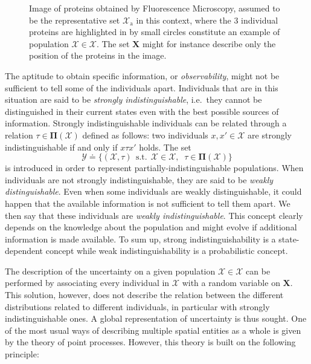 \documentclass{aptpub}
\numberwithin{equation}{section}
\begin{document}
\begin{figure}
\centering

\scriptsize

\caption{Image of proteins obtained by Fluorescence Microscopy, assumed to be the representative set ${\boldsymbol{\mathcal{X}}}_{\mathrm{a}}$ in this context, where the 3 individual proteins are highlighted in by small circles constitute an example of population ${\mathcal{X}} \in {\boldsymbol{\mathcal{X}}}$. The set ${\mathbf{X}}$ might for instance describe only the position of the proteins in the image.}
\label{fig:population}
\end{figure}

The aptitude to obtain specific information, or \emph{observability}, might not be sufficient to tell some of the individuals apart. Individuals that are in this situation are said to be \emph{strongly indistinguishable}, i.e.\ they cannot be distinguished in their current states even with the best possible sources of information. Strongly indistinguishable individuals can be related through a relation $\tau \in {\boldsymbol{\Pi}}({\mathcal{X}})$ defined as follows: two individuals $x,x' \in {\mathcal{X}}$ are strongly indistinguishable if and only if $x \tau x'$ holds. 
The set
{\begin{equation*}{
{\boldsymbol{\mathcal{Y}}} {\doteq} \{({\mathcal{X}},\tau) {\;\,\mbox{s.t.}\;\,} {\mathcal{X}} \in {\boldsymbol{\mathcal{X}}} {,\;\;} \tau \in {\boldsymbol{\Pi}}({\mathcal{X}}) \}
}\end{equation*}}
is introduced in order to represent partially-indistinguishable populations. 
When individuals are not strongly indistinguishable, they are said to be \emph{weakly distinguishable}. Even when some individuals are weakly distinguishable, it could happen that the available information is not sufficient to tell them apart. We then say that these individuals are \emph{weakly indistinguishable}. This concept clearly depends on the knowledge about the population and might evolve if additional information is made available. To sum up, strong indistinguishability is a state-dependent concept while weak indistinguishability is a probabilistic concept.

The description of the uncertainty on a given population ${\mathcal{X}} \in {\boldsymbol{\mathcal{X}}}$ can be performed by associating every individual in ${\mathcal{X}}$ with a random variable on ${\mathbf{X}}$. This solution, however, does not describe the relation between the different distributions related to different individuals, in particular with strongly indistinguishable ones. A global representation of uncertainty is thus sought. One of the most usual ways of describing multiple spatial entities as a whole is given by the theory of point processes. However, this theory is built on the following principle:
\end{document}
